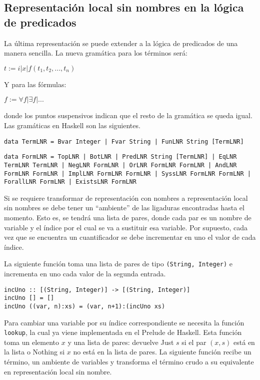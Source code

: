 \documentclass{article}
\begin{document}
\subsection{Representación local sin nombres en la lógica de predicados}

La última representación se puede extender a la lógica de predicados de una manera sencilla. La nueva gramática para los términos será:

$t := i | x | f (t_1, t_2, ..., t_n)$

Y para las fórmulas:

$f := \forall f | \exists f | ...$

donde los puntos suspensivos indican que el resto de la gramática se queda igual. Las gramáticas en Haskell son las siguientes.

\texttt{data TermLNR = Bvar Integer | Fvar String | FunLNR String [TermLNR]}

\texttt{data FormLNR  = TopLNR | BotLNR | PredLNR String [TermLNR] | EqLNR TermLNR TermLNR | NegLNR FormLNR | OrLNR FormLNR FormLNR | AndLNR FormLNR FormLNR | ImplLNR FormLNR FormLNR | SyssLNR FormLNR FormLNR | ForallLNR FormLNR | ExistsLNR FormLNR}

Si se requiere transformar de representación con nombres a representación local sin nombres se debe tener un ``ambiente'' de las ligaduras encontradas hasta el momento. Esto es, se tendrá una lista de pares, donde cada par es un nombre de variable y el índice por el cual se va a sustituir esa variable. Por supuesto, cada vez que se encuentra un cuantificador se debe incrementar en uno el valor de cada índice.

La siguiente función toma una lista de pares de tipo \texttt{(String, Integer)} e incrementa en uno cada valor de la segunda entrada.

\begin{verbatim}
incUno :: [(String, Integer)] -> [(String, Integer)]
incUno [] = []
incUno ((var, n):xs) = (var, n+1):(incUno xs)
\end{verbatim}

Para cambiar una variable por su índice correspondiente se necesita la función \texttt{lookup}, la cual ya viene implementada en el Prelude de Haskell. Esta función toma un elemento $x$ y una lista de pares: devuelve Just $s$ si el par $(x, s)$ está en la lista o Nothing si $x$ no está en la lista de pares. La siguiente función recibe un término, un ambiente de variables y transforma el término crudo a su equivalente en representación local sin nombre.
\end{document}

